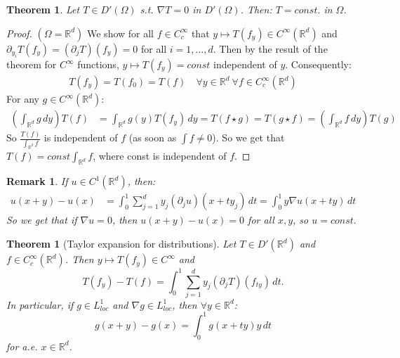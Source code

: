 \documentclass{report}
\theoremstyle{tommy}
\newtheorem{thm}[defn]{Theorem}
\newtheorem{rem}[defn]{Remark}
\begin{document}
  \begin{thm}
    Let \(T \in D'(\Omega)\) s.t. \(\nabla T = 0\) in \(D'(\Omega)\). Then: \(T = const.\) in \(\Omega\).
  \end{thm}

  \begin{proof}
    \((\Omega = \mathbb{R}^d)\) We show for all \(f \in C_c^\infty\) that \(y \mapsto T(f_y) \in C^\infty(\mathbb{R}^d)\) and \(\partial_{y_i} T(f_y) = (\partial_j T)(f_y) = 0\) for all \(i = 1, \dots, d\). Then by the result of the theorem for \(C^\infty\) functions,
    \(y \mapsto T(f_y) = const\) independent of \(y\). Consequently:
    \begin{align*}
      T(f_y) = T(f_0) = T(f) \quad \forall y \in \mathbb{R}^d \ \forall f \in C_c^\infty(\mathbb{R}^d)
    \end{align*}
    For any \(g \in C^\infty(\mathbb{R}^d)\):
    \begin{align*}
      \left(\int_{\mathbb{R}^d} g \, dy\right) T(f)
      &= \int_{\mathbb{R}^d} g(y) T(f_y) \, dy
      = T(f \star g)
      = T(g \star f)
      = \left(\int_{\mathbb{R}^d} f \, dy\right) T(g)
    \end{align*}
    So \(\frac{T(f)}{\int_{\mathbb{R}^d}f}\) is independent of \(f\) (as soon as \(\int f \ne 0\)). So we get that \(T(f) = const \int_{\mathbb{R}^d} f\), where const is independent of \(f\).
  \end{proof}
  
  \begin{rem}
    If \(u \in C^1(\mathbb{R}^d)\), then:
      \begin{align*}
        u(x+y) - u(x) 
        &= \int_0^1 \sum_{j=1}^d y_j (\partial_j u)(x + ty_j) \, dt
        = \int_0^1 y \nabla u(x+ty) \, dt
      \end{align*}
      So we get that if \(\nabla u = 0\), then \(u(x+y) - u(x) = 0\) for all \(x,y\), so \(u = const.\)
  \end{rem}

  \begin{thm}[Taylor expansion for distributions]
    Let \(
      T \in D'(\mathbb{R}^d)\) and \(f \in C_c^\infty(\mathbb{R}^d)\). Then \(y \mapsto T(f_y) \in C^\infty\)
       and 
    \[T(f_y) - T(f) = \int_0^1 \sum_{j=1}^d y_j(\partial_j T) (f_{ty}) \, dt.\]
    In particular, if \(g \in L_{loc}^1\) and \(\nabla g \in L_{loc}^1\), then \(\forall y \in \mathbb{R}^d\):
    \[g (x+y) - g(x) = \int_0^1 g(x + ty) y \, dt\]
    for a.e. \(x \in \mathbb{R}^d\).
  \end{thm}
\end{document}
